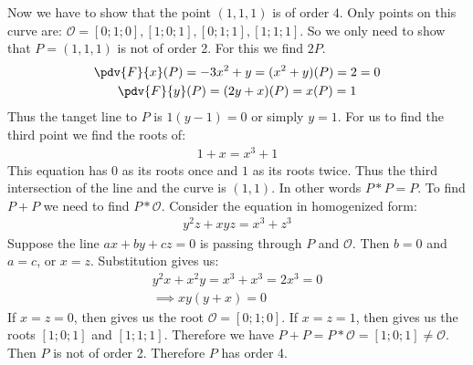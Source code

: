 \begin{enumerate}[label=]
\begin{enumerate}[label=\alph*)]
        \end{enumerate}
        Now we have to show that the point $(1, 1, 1)$ is of order $4$. Only points on this curve are: $\mathcal O = [0; 1; 0], [1; 0; 1], [0; 1; 1], [1; 1; 1]$. So we only need to show that $P = (1, 1, 1)$ is not of order 2. For this we find $2P$. 
        \begin{gather*}
            \pdv{F}{x}(P) = - 3x^2 + y = (x^2 + y) (P) = 2 = 0 \\
            \pdv{F}{y}(P) = (2y + x)(P) = x(P) = 1  
        \end{gather*}
        Thus the tanget line to $P$ is $1(y - 1) = 0$ or simply $y = 1$. For us to find the third point we find the roots of:
        \begin{gather*}
            1 + x = x^3 + 1
        \end{gather*}
        This equation has 0 as its roots once and $1$ as its roots twice. Thus the third intersection of the line and the curve is $(1, 1)$. In other words $P \ast P = P$. To find $P + P$ we need to find $P \ast \mathcal O$. Consider the equation in homogenized form:
        \begin{gather*}
            y^2z + xyz = x^3 + z^3
        \end{gather*}
        Suppose the line $ax + by + cz = 0$ is passing through $P$ and $\mathcal O$. Then $b = 0$ and $a = c$, or $x = z$. Substitution gives us:
        \begin{gather*}
            y^2x + x^2y = x^3 + x^3 = 2x^3 = 0 \\
            \implies xy (y + x) = 0
        \end{gather*}
        If $x = z = 0$, then gives us the root $\mathcal O = [0; 1; 0]$. If $x = z = 1$, then gives us the roots $[1; 0; 1]$ and $[1; 1; 1]$. Therefore we have $P + P = P \ast \mathcal O = [1; 0; 1] \ne \mathcal O$. Then $P$ is not of order 2. Therefore $P$ has order 4.
\end{enumerate}